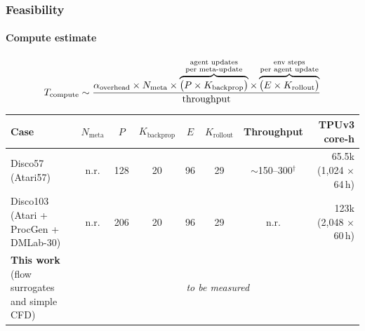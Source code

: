 %

\begin{frame}
	\frametitle{Feasibility}
	\framesubtitle{Compute estimate}
    \vspace{-1cm}

	\[
		T_{\text{compute}} \sim
		\frac{
			\alpha_{\text{overhead}} \times N_{\text{meta}}
			\times
			\overbrace{\big(P \times K_{\text{backprop}}\big)}^{\mathclap{\substack{\text{agent updates}\\\text{per meta-update}}}}
			\times
			\overbrace{\big(E \times K_{\text{rollout}}\big)}^{\mathclap{\substack{\text{env steps}\\\text{per agent update}}}}
		}{
			\text{throughput}
		}
	\]

	\vspace{-1mm}
	\scriptsize
	\setlength{\tabcolsep}{4pt}
	\begin{tabular}{@{}l c c c c c c r@{}}
		\toprule
		Case & $N_{\text{meta}}$ & $P$ & $K_{\text{backprop}}$ & $E$ & $K_{\text{rollout}}$
			& Throughput & TPUv3 core-h \\
		\midrule
		Disco57 {\tiny(Atari57)}
			& n.r. & 128 & 20 & 96 & 29 & $\sim$150--300$^{\dagger}$
			& 65.5k {\tiny(1{,}024 $\times$ 64\,h)} \\
		Disco103 {\tiny(Atari + ProcGen + DMLab-30)}
			& n.r. & 206 & 20 & 96 & 29 & n.r.
			& 123k {\tiny(2{,}048 $\times$ 60\,h)} \\
		\midrule
		\textbf{This work} {\tiny(flow surrogates and simple CFD)}
			& \multicolumn{7}{c}{\textit{to be measured}} \\
		\bottomrule
	\end{tabular}


\end{frame}
